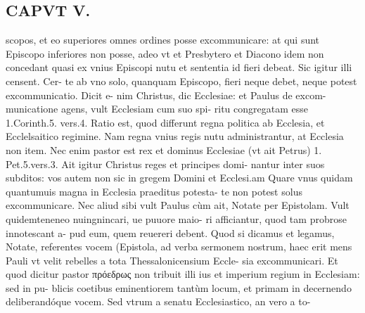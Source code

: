 \documentclass{article}
\begin{document}
\begin{pages}
\section*{CAPVT V. }
\marginpar{[ p.393 ]}\pstart scopos, et eo superiores omnes ordines posse excommunicare: at qui sunt Episcopo inferiores non posse, adeo vt et Presbytero et Diacono idem non concedant quasi ex vnius Episcopi nutu et sententia id fieri debeat. Sic igitur illi censent. Cer- te ab vno solo, quanquam Episcopo, fieri neque debet, neque potest excommunicatio. Dicit e- nim Christus, dic Ecclesiae: et Paulus de excom- municatione agens, vult Ecclesiam cum suo spi- ritu congregatam esse 1.Corinth.5. vers.4. Ratio est, quod differunt regna politica ab Ecclesia, et Ecclelsaitico regimine. Nam regna vnius regis nutu administrantur, at Ecclesia non item. Nec enim pastor est rex et dominus Ecclesiae (vt ait Petrus) 1. Pet.5.vers.3.  \pend\pstart Ait igitur Christus reges et principes domi- nantur inter suos subditos: vos autem non sic in gregem Domini et Ecclesi.am Quare vnus quidam quantumuis magna in Ecclesia praeditus potesta- te non potest solus excommunicare. Nec aliud sibi vult Paulus cùm ait, Notate per Epistolam. Vult quidemteneneo nuingnincari, ue puuore maio- ri afficiantur, quod tam probrose innotescant a- pud eum, quem reuereri debent. Quod si dicamus et legamus, Notate, referentes vocem (Epistola, ad verba sermonem nostrum, haec erit mens Pauli vt velit rebelles a tota Thessalonicensium Eccle- sia excommunicari.  \pend\pstart Et quod dicitur pastor πρόεδρως non tribuit illi ius et imperium regium in Ecclesiam: sed in pu- blicis coetibus eminentiorem tantùm locum, et primam in decernendo deliberandóque vocem. Sed vtrum a senatu Ecclesiastico, an vero a to-  \pend

\end{pages}
\end{document}
